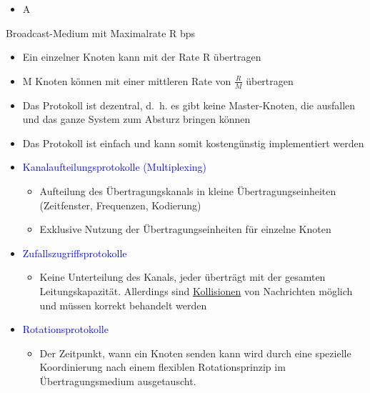 
\begin{itemize}
    \item \todo A
\end{itemize}

Broadcast-Medium mit Maximalrate R bps
\begin{itemize}
    \item Ein einzelner Knoten kann mit der Rate R übertragen
    \item M Knoten können mit einer mittleren Rate von $\frac{R}{M}$ übertragen
    \item Das Protokoll ist dezentral, d.\ h. es gibt keine Master-Knoten, die ausfallen und das ganze System zum Absturz bringen können
    \item Das Protokoll ist einfach und kann somit kostengünstig implementiert werden
\end{itemize}

\begin{itemize}
    \item \textcolor{blue}{Kanalaufteilungsprotokolle (Multiplexing)}
    \begin{itemize}
        \item Aufteilung des Übertragungskanals in kleine Übertragungseinheiten (Zeitfenster, Frequenzen, Kodierung)
        \item Exklusive Nutzung der Übertragungseinheiten für einzelne Knoten
    \end{itemize}
    \item \textcolor{blue}{Zufallszugriffsprotokolle}
    \begin{itemize}
        \item Keine Unterteilung des Kanals, jeder überträgt mit der gesamten Leitungskapazität.
        Allerdings sind \underline{Kollisionen} von Nachrichten möglich und müssen korrekt behandelt werden
    \end{itemize}
    \item \textcolor{blue}{Rotationsprotokolle}
    \begin{itemize}
        \item Der Zeitpunkt, wann ein Knoten senden kann wird durch eine spezielle Koordinierung nach einem flexiblen Rotationsprinzip im Übertragungsmedium ausgetauscht.
    \end{itemize}
\end{itemize}

